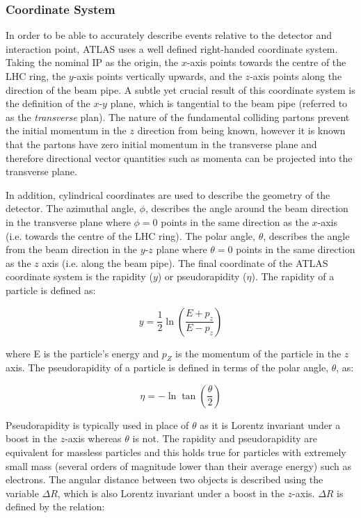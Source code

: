 \documentclass[12pt,a4paper,epsf,portrait,times,epsfig]{article}
\begin{document}
		\subsubsection{Coordinate System}

		In order to be able to accurately describe events relative to the detector and interaction point, ATLAS uses a well defined right-handed coordinate system. Taking the nominal IP as the origin, the $x$-axis points towards the centre of the LHC ring, the $y$-axis points vertically upwards, and the $z$-axis points along the direction of the beam pipe. A subtle yet crucial result of this coordinate system is the definition of the $x$-$y$ plane, which is tangential to the beam pipe (referred to as the \textit{transverse} plan). The nature of the fundamental colliding partons prevent the initial momentum in the $z$ direction from being known, however it is known that the partons have zero initial momentum in the transverse plane and therefore directional vector quantities such as momenta can be projected into the transverse plane. \par

		In addition, cylindrical coordinates are used to describe the geometry of the detector. The azimuthal angle, $\phi$, describes the angle around the beam direction in the transverse plane where $\phi = 0$ points in the same direction as the $x$-axis (i.e. towards the centre of the LHC ring). The polar angle, $\theta$, describes the angle from the beam direction in the $y$-$z$ plane where $\theta = 0$ points in the same direction as the $z$ axis (i.e. along the beam pipe). The final coordinate of the ATLAS coordinate system is the rapidity ($y$) or pseudorapidity ($\eta$). The rapidity of a particle is defined as: 

		\begin{equation}
			y = \frac{1}{2}\ln\left(\frac{E+p_{z}}{E-p_{z}}\right)
		\end{equation}

		where E is the particle's energy and $p_{Z}$ is the momentum of the particle in the $z$ axis. The pseudorapidity of a particle is defined in terms of the polar angle, $\theta$, as:

		\begin{equation}
			\eta = -\ln\tan\left(\frac{\theta}{2}\right)
		\end{equation}

		Pseudorapidity is typically used in place of $\theta$ as it is Lorentz invariant under a boost in the $z$-axis whereas $\theta$ is not. The rapidity and pseudorapidity are equivalent for massless particles and this holds true for particles with extremely small mass (several orders of magnitude lower than their average energy) such as electrons. The angular distance between two objects is described using the variable $\Delta R$, which is also Lorentz invariant under a boost in the $z$-axis. $\Delta R$ is defined by the relation:
\end{document}
